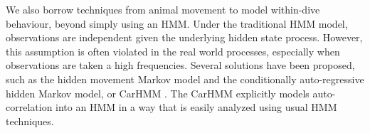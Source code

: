 %

We also borrow techniques from animal movement to model within-dive behaviour, beyond simply using an HMM.  
Under the traditional HMM model,  observations are independent given  the underlying hidden state process.
However, this assumption is often violated in the real world processes, especially when observations are taken a high frequencies. 
Several solutions have been proposed, such as the hidden movement Markov model \citep{Whoriskey:2016} and the conditionally auto-regressive hidden Markov model, or CarHMM \citep{Lawler:2019}. 
The CarHMM explicitly models auto-correlation into an HMM in a way that is easily analyzed using usual HMM techniques.

